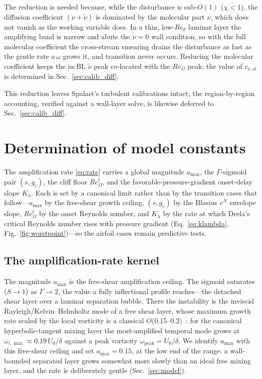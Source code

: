 \documentclass[journal]{new-aiaa}
\begin{document}
The reduction is needed because, while the disturbance is sub-$O(1)$
($\chi\!<\!1$), the diffusion coefficient $(\nu+\tilde\nu)$ is dominated by the
molecular part $\nu$, which does not vanish as the working variable does. In a
thin, low-$Re_\theta$ laminar layer the amplifying band is narrow and abuts the
$\tilde\nu\!=\!0$ wall condition, so with the full molecular coefficient the
cross-stream smearing drains the disturbance as fast as the gentle rate
$a\,\omega$ grows it, and transition never occurs. Reducing the molecular
coefficient keeps the in-BL $\tilde\nu$ peak co-located with the $Re_\Omega$
peak; the value of $c_{\nu,\mathrm{ai}}$ is determined in
Sec.~\ref{sec:calib_diff}.

This reduction leaves Spalart's turbulent calibrations intact; the
region-by-region accounting, verified against a wall-layer solve, is likewise
deferred to Sec.~\ref{sec:calib_diff}.

\section{Determination of model constants}\label{sec:calib}

The amplification rate \eqref{eq:rate} carries a global magnitude $a_{\max}$, the
$\Gamma$-sigmoid pair $(s,g_c)$, the cliff floor $Re_\Omega^{\mathrm{f}}$, and the
favorable-pressure-gradient onset-delay slope $K_\lambda$. Each is set by a
canonical limit rather than by the transition cases that follow---$a_{\max}$ by the
free-shear growth ceiling, $(s,g_c)$ by the Blasius $e^N$ envelope slope,
$Re_\Omega^{\mathrm{f}}$ by the onset Reynolds number, and $K_\lambda$ by the rate
at which Drela's critical Reynolds number rises with pressure gradient
(Eq.~\eqref{eq:klambda}, Fig.~\ref{fig:worstpoint})---so the airfoil cases
remain predictive tests.

\subsection{The amplification-rate kernel}\label{sec:calib_rate}

The magnitude $a_{\max}$ is the free-shear amplification ceiling. The sigmoid
saturates ($S\!\to\!1$) as $\Gamma\!\to\!2$, the value a fully inflectional
profile reaches---the detached shear layer over a laminar separation bubble.
There the instability is the inviscid Rayleigh/Kelvin--Helmholtz mode of a free
shear layer, whose maximum growth rate scaled by the local vorticity is a
classical $O(0.15$--$0.2)$~\cite{michalke_1964}: for the canonical
hyperbolic-tangent mixing layer the most-amplified temporal mode grows at
$\omega_{i,\max}\!\approx\!0.19\,U_0/\delta$ against a peak vorticity
$\omega_\mathrm{peak}\!=\!U_0/\delta$. We identify $a_{\max}$
with this free-shear ceiling and set $a_{\max}\!=\!0.15$, at the low end of the
range: a wall-bounded separated layer grows somewhat more slowly than an ideal
free mixing layer, and the rate is deliberately gentle (Sec.~\ref{sec:model}).
\end{document}
